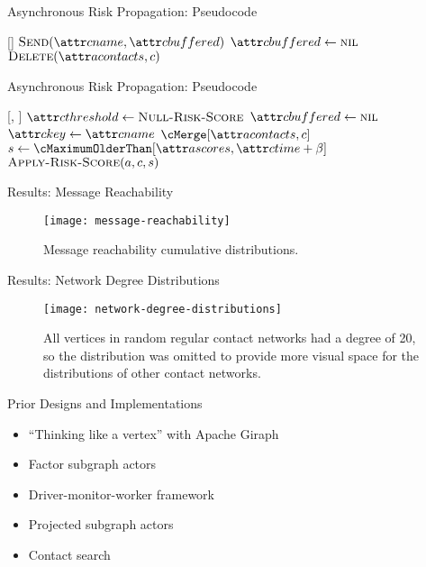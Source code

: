 \documentclass[11pt]{beamer}
\begin{document}
\begin{frame}{Asynchronous Risk Propagation: Pseudocode}
\begin{function}{\nHandleFlushTimeout}[\vActor]
  \ForEach{$\vContact \in \aActorContacts$}
    \pause
    \If{$\aContactBuffered \notEquals \nil$}
      \pause
      \State $\cSend[\aContactName, \aContactBuffered]$
      \pause
      \State $\aContactBuffered \assign \nil$
    \EndIf
    \pause
      \State $\cDelete[\aActorContacts, \vContact]$
    \EndIf
  \EndFor
\end{function}
\end{frame}

\begin{frame}{Asynchronous Risk Propagation: Pseudocode}
\begin{function}{\nHandleContact}[\vActor, \vContact]
    \pause
    \State $\aContactThreshold \assign \cNullRiskScore$
    \pause
    \State $\aContactBuffered \assign \nil$
    \pause
    \State $\aContactKey \assign \aContactName$
    \pause
    \State $\cMerge[\aActorContacts, \vContact]$
    \pause
    \State $\vScore \assign \cMaximumOlderThan[\aActorScores, \aContactTime + \pTimeBuffer]$
    \pause
    \State $\cApplyRiskScore[\vActor, \vContact, \vScore]$
  \EndIf
\end{function}
\end{frame}

\begin{frame}{Results: Message Reachability}
\begin{figure}
  \centering
  \texttt{[image: message-reachability]}
  \caption[Message reachability cumulative distributions]{Message reachability cumulative distributions.}
\end{figure}
\end{frame}

\begin{frame}{Results: Network Degree Distributions}
\begin{figure}
  \centering
  \texttt{[image: network-degree-distributions]}
  \caption[Contact network degree distributions]{All vertices in random regular contact networks had a degree of 20, so the distribution was omitted to provide more visual space for the distributions of other contact networks.}
\end{figure}
\end{frame}

\begin{frame}{Prior Designs and Implementations}
\begin{itemize}
  \item  ``Thinking like a vertex'' with Apache Giraph
  \item Factor subgraph actors
  \item Driver-monitor-worker framework
  \item Projected subgraph actors \citep{Tatton2022b}
  \item Contact search
\end{itemize}
\end{frame}
\end{document}
